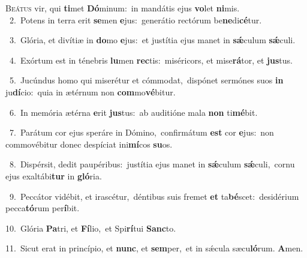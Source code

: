 \lettrine{\initial\textcolor{\initialcolor}{B}}{eátus} vir, qui \textbf{ti}\-met \textbf{Dó}\-minum:~\star in mandátis ejus \textbf{vo}\-let \textbf{ni}\-mis.\\
{\numbfont\textcolor{\numbcolor}{~2.}}~Potens in terra erit \textbf{se}\-men \textbf{e}\-jus:~\star generátio rectórum be\-\textbf{ne}\-di\-\textbf{cé}\-tur.\par
{\numbfont\textcolor{\numbcolor}{~3.}}~Glória, et divítiæ in \textbf{do}\-mo \textbf{e}\-jus:~\star et justítia ejus manet in \textbf{sǽ}\-culum \textbf{sǽ}\-culi.\par
{\numbfont\textcolor{\numbcolor}{~4.}}~Exórtum est in ténebris \textbf{lu}\-men \textbf{rec}\-tis:~\star miséricors, et mise\-\textbf{rá}\-tor, et \textbf{jus}\-tus.\par
{\numbfont\textcolor{\numbcolor}{~5.}}~Jucúndus homo qui miserétur et cómmodat,~\dagger dispónet sermónes suos \textbf{in} ju\-\textbf{dí}\-cio:~\star quia in ætérnum non \textbf{com}\-mo\-\textbf{vé}\-bitur.\par
{\numbfont\textcolor{\numbcolor}{~6.}}~In memória ætérna \textbf{e}\-rit \textbf{jus}\-tus:~\star ab auditióne mala \textbf{non} ti\-\textbf{mé}\-bit.\par
{\numbfont\textcolor{\numbcolor}{~7.}}~Parátum cor ejus speráre in Dómino,~\dagger confirmátum \textbf{est} cor \textbf{e}\-jus:~\star non commovébitur donec despíciat ini\-\textbf{mí}\-cos \textbf{su}\-os.\par
{\numbfont\textcolor{\numbcolor}{~8.}}~Dispérsit, dedit paupéribus:~\dagger justítia ejus manet in \textbf{sǽ}\-culum \textbf{sǽ}\-culi,~\star cornu ejus exaltábi\textbf{tur} in \textbf{gló}\-ria.\par
{\numbfont\textcolor{\numbcolor}{~9.}}~Peccátor vidébit, et irascétur,~\dagger déntibus suis fremet \textbf{et} ta\-\textbf{bé}\-scet:~\star desidérium pecca\-\textbf{tó}\-rum per\-\textbf{í}\-bit.\par
{\numbfont\textcolor{\numbcolor}{10.}}~Glória \textbf{Pa}\-tri, et \textbf{Fí}\-lio,~\star et Spi\-\textbf{rí}\-tui \textbf{Sanc}\-to.\par
{\numbfont\textcolor{\numbcolor}{11.}}~Sicut erat in princípio, et \textbf{nunc}\-, et \textbf{sem}\-per,~\star et in sǽcula sæcu\-\textbf{ló}\-rum. \textbf{A}\-men.\par

